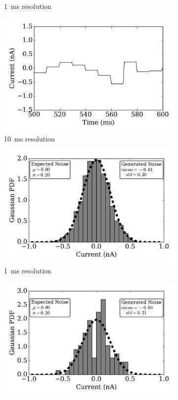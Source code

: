 \begin{figure}[tbp!]
\begin{subfigure}[t]{0.49\textwidth}
			\caption{1~ms resolution}
			\label{Fig:signal-1}
		\end{subfigure}
		\begin{subfigure}[t]{0.49\textwidth}
			\includegraphics[width=\textwidth]{pics_iconip/curr_dt10.pdf}
			\caption{10~ms resolution}
			\label{Fig:signal-10}
		\end{subfigure}
		\begin{subfigure}[t]{0.49\textwidth}
			\includegraphics[width=\textwidth]{pics_iconip/distr_dt1.pdf}
			\caption{1~ms resolution}
			\label{Fig:gaussian-1}
		\end{subfigure}
		\begin{subfigure}[t]{0.49\textwidth}
			\includegraphics[width=\textwidth]{pics_iconip/distr_dt10.pdf}

\end{subfigure}
\end{figure}
